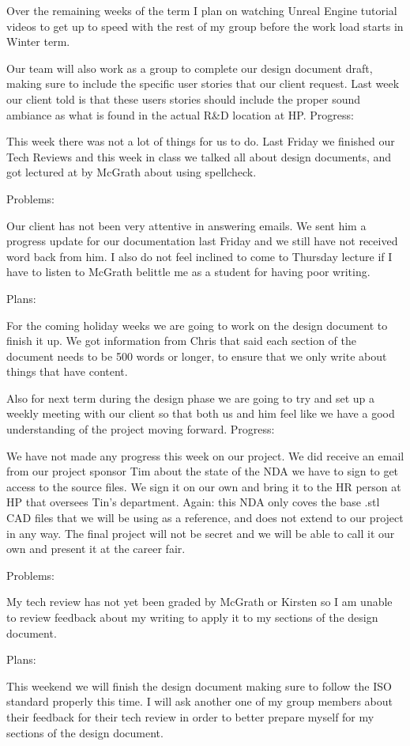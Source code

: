 Over the remaining weeks of the term I plan on watching Unreal Engine tutorial videos to get up to speed with the rest of my group before the work load starts in Winter term. 

Our team will also work as a group to complete our design document draft, making sure to include the specific user stories that our client request. Last week our client told is that these users stories should include the proper sound ambiance as what is found in the actual R&D location at HP.
Progress:

This week there was not a lot of things for us to do. Last Friday we finished our Tech Reviews and this week in class we talked all about design documents, and got lectured at by McGrath about using spellcheck.

Problems:

Our client has not been very attentive in answering emails. We sent him a progress update for our documentation last Friday and we still have not received word back from him. I also do not feel inclined to come to Thursday lecture if I have to listen to McGrath belittle me as a student for having poor writing.

Plans:

For the coming holiday weeks we are going to work on the design document to finish it up. We got information from Chris that said each section of the document needs to be 500 words or longer, to ensure that we only write about things that have content.

Also for next term during the design phase we are going to try and set up a weekly meeting with our client so that both us and him feel like we have a good understanding of the project moving forward.
Progress:

We have not made any progress this week on our project.  We did receive an email from our project sponsor Tim about the state of the NDA we have to sign to get access to the source files. We sign it on our own and bring it to the HR person at HP that oversees Tin's department. Again: this NDA only coves the base .stl CAD files that we will be using as a reference, and does not extend to our project in any way. The final project will not be secret and we will be able to call it our own and present it at the career fair.

Problems:

My tech review has not yet been graded by McGrath or Kirsten so I am unable to review feedback about my writing to apply it to my sections of the design document.

Plans:

This weekend we will finish the design document making sure to follow the ISO standard properly this time. I will ask another one of my group members about their feedback for their tech review in order to better prepare myself for my sections of the design document.